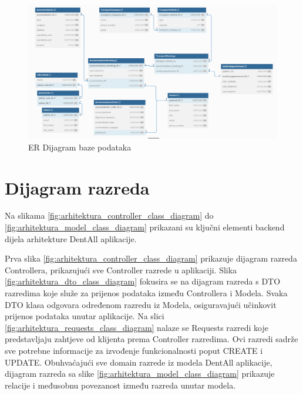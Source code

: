 				\begin{figure}[H]
					\includegraphics[scale=0.32]{slike/dijagram_baze.png} %
					\centering
					\caption{ER Dijagram baze podataka}
					\label{fig:dijagram_baze_podataka}
				\end{figure}
			
			\eject
			
			
		\section{Dijagram razreda}
		
			Na slikama \ref{fig:arhitektura_controller_class_diagram}  do \ref{fig:arhitektura_model_class_diagram}  prikazani su ključni elementi backend dijela arhitekture DentAll aplikacije. 
			
			Prva slika \ref{fig:arhitektura_controller_class_diagram}  prikazuje dijagram razreda Controllera, prikazujući sve Controller razrede u aplikaciji.  Slika \ref{fig:arhitektura_dto_class_diagram} fokusira se na dijagram razreda s DTO razredima koje služe za prijenos podataka između Controllera i Modela. Svaka DTO klasa odgovara određenom razredu iz Modela, osiguravajući učinkovit prijenos podataka unutar aplikacije. Na slici \ref{fig:arhitektura_requests_class_diagram} nalaze se Requests razredi koje predstavljaju zahtjeve od klijenta prema Controller razredima. Ovi razredi sadrže sve potrebne informacije za izvođenje funkcionalnosti poput CREATE i UPDATE. Obuhvaćajući sve domain razrede iz modela DentAll aplikacije, dijagram razreda sa slike  \ref{fig:arhitektura_model_class_diagram} prikazuje relacije i međusobnu povezanost između razreda unutar modela. 
			
